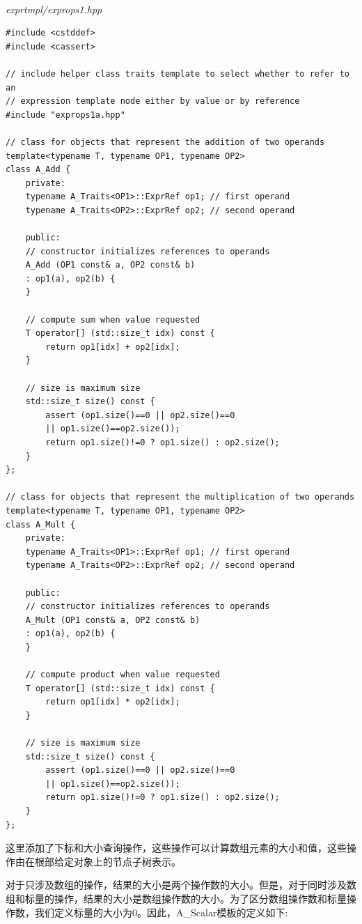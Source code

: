\hspace*{\fill} \\ %
\noindent
\textit{exprtmpl/exprops1.hpp}
\begin{lstlisting}[style=styleCXX]
#include <cstddef>
#include <cassert>

// include helper class traits template to select whether to refer to an
// expression template node either by value or by reference
#include "exprops1a.hpp"

// class for objects that represent the addition of two operands
template<typename T, typename OP1, typename OP2>
class A_Add {
	private:
	typename A_Traits<OP1>::ExprRef op1; // first operand
	typename A_Traits<OP2>::ExprRef op2; // second operand
	
	public:
	// constructor initializes references to operands
	A_Add (OP1 const& a, OP2 const& b)
	: op1(a), op2(b) {
	}

	// compute sum when value requested
	T operator[] (std::size_t idx) const {
		return op1[idx] + op2[idx];
	}

	// size is maximum size
	std::size_t size() const {
		assert (op1.size()==0 || op2.size()==0
		|| op1.size()==op2.size());
		return op1.size()!=0 ? op1.size() : op2.size();
	}
};

// class for objects that represent the multiplication of two operands
template<typename T, typename OP1, typename OP2>
class A_Mult {
	private:
	typename A_Traits<OP1>::ExprRef op1; // first operand
	typename A_Traits<OP2>::ExprRef op2; // second operand
	
	public:
	// constructor initializes references to operands
	A_Mult (OP1 const& a, OP2 const& b)
	: op1(a), op2(b) {
	}

	// compute product when value requested
	T operator[] (std::size_t idx) const {
		return op1[idx] * op2[idx];
	}

	// size is maximum size
	std::size_t size() const {
		assert (op1.size()==0 || op2.size()==0
		|| op1.size()==op2.size());
		return op1.size()!=0 ? op1.size() : op2.size();
	}
};
\end{lstlisting}

这里添加了下标和大小查询操作，这些操作可以计算数组元素的大小和值，这些操作由在根部给定对象上的节点子树表示。

对于只涉及数组的操作，结果的大小是两个操作数的大小。但是，对于同时涉及数组和标量的操作，结果的大小是数组操作数的大小。为了区分数组操作数和标量操作数，我们定义标量的大小为0。因此，A\_Scalar模板的定义如下:

